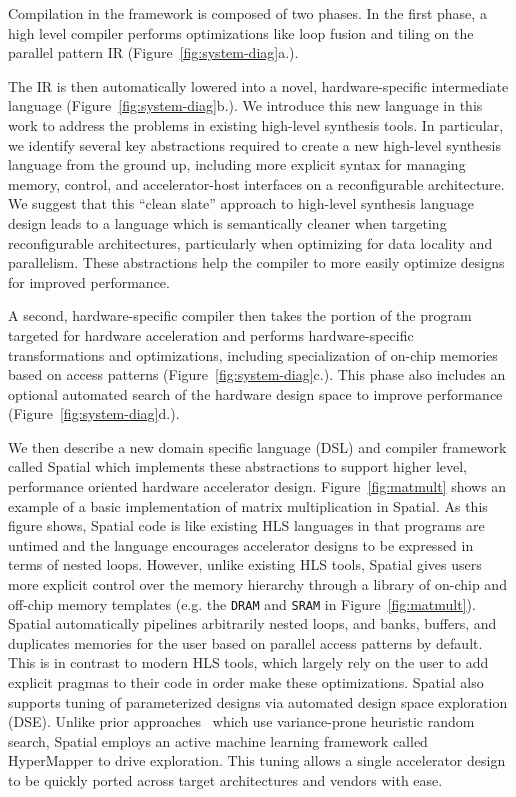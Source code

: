 Compilation in the framework is composed of two phases. In the first phase,
a high level compiler performs optimizations like loop fusion and tiling
on the parallel pattern IR (Figure~\ref{fig:system-diag}a.).

The IR is then automatically lowered into a novel, hardware-specific intermediate
language (Figure~\ref{fig:system-diag}b.).
We introduce this new language in this work to address the problems in existing
high-level synthesis tools. In particular, we identify several key
abstractions required to create a new high-level synthesis language from the
ground up, including more explicit syntax for managing memory, control,
and accelerator-host interfaces on a reconfigurable architecture.
We suggest that this ``clean slate'' approach to high-level synthesis language
design leads to a language which is semantically cleaner when targeting
reconfigurable architectures, particularly when optimizing for data locality and parallelism.
These abstractions help the compiler to more easily optimize designs for improved performance.

A second, hardware-specific compiler then takes the portion of the program
targeted for hardware acceleration and performs hardware-specific transformations and
optimizations, including specialization of on-chip memories based on access patterns (Figure~\ref{fig:system-diag}c.).
This phase also includes an optional automated search of the hardware design space
to improve performance (Figure~\ref{fig:system-diag}d.).

We then describe a new domain specific language (DSL) and compiler framework called Spatial which implements these abstractions to support higher level, performance oriented hardware accelerator design.
Figure~\ref{fig:matmult} shows an example of a basic implementation of matrix multiplication in Spatial.
As this figure shows, Spatial code is like existing HLS languages in that programs are untimed and the language encourages accelerator designs to be expressed in terms of nested loops. However, unlike existing HLS tools, Spatial gives users more explicit control over the memory hierarchy through a library of on-chip and off-chip memory templates (e.g. the \texttt{DRAM} and \texttt{SRAM} in Figure~\ref{fig:matmult}).
Spatial automatically pipelines arbitrarily nested loops, and banks, buffers, and duplicates memories for the user based on parallel access patterns by default.
This is in contrast to modern HLS tools, which largely rely on the user to add explicit pragmas to their code in order make these optimizations.
Spatial also supports tuning of parameterized designs via automated design space exploration (DSE).
Unlike prior approaches~\cite{dhdl} which use variance-prone heuristic random search, Spatial employs an active machine learning framework called HyperMapper \cite{Bodin2016:PACT16} to drive exploration.
This tuning allows a single accelerator design to be quickly ported across target architectures and vendors with ease.

